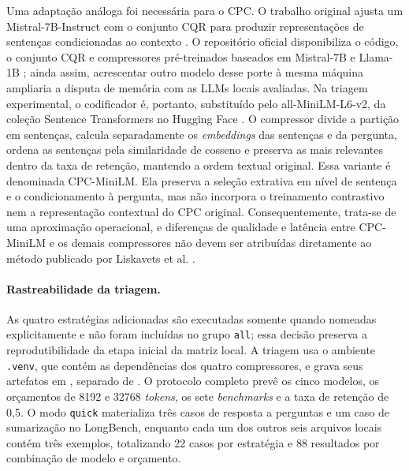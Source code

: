 Uma adaptação análoga foi necessária para o CPC. O trabalho original ajusta um Mistral-7B-Instruct com o conjunto CQR para produzir representações de sentenças condicionadas ao contexto \cite{li2024cpc}. O repositório oficial disponibiliza o código, o conjunto CQR e compressores pré-treinados baseados em Mistral-7B e Llama-1B \cite{workday2025cpc}; ainda assim, acrescentar outro modelo desse porte à mesma máquina ampliaria a disputa de memória com as LLMs locais avaliadas. Na triagem experimental, o codificador é, portanto, substituído pelo all-MiniLM-L6-v2, da coleção Sentence Transformers no Hugging Face \cite{huggingface2022allminilm}. O compressor divide a partição em sentenças, calcula separadamente os \textit{embeddings} das sentenças e da pergunta, ordena as sentenças pela similaridade de cosseno e preserva as mais relevantes dentro da taxa de retenção, mantendo a ordem textual original. Essa variante é denominada CPC-MiniLM. Ela preserva a seleção extrativa em nível de sentença e o condicionamento à pergunta, mas não incorpora o treinamento contrastivo nem a representação contextual do CPC original. Consequentemente, trata-se de uma aproximação operacional, e diferenças de qualidade e latência entre CPC-MiniLM e os demais compressores não devem ser atribuídas diretamente ao método publicado por Liskavets et al. \cite{li2024cpc}.

\paragraph{Rastreabilidade da triagem.}
As quatro estratégias adicionadas são executadas somente quando nomeadas explicitamente e não foram incluídas no grupo \texttt{all}; essa decisão preserva a reprodutibilidade da etapa inicial da matriz local. A triagem usa o ambiente \texttt{.venv}, que contém as dependências dos quatro compressores, e grava seus artefatos em , separado de . O protocolo completo prevê os cinco modelos, os orçamentos de 8192 e 32768 \textit{tokens}, os sete \textit{benchmarks} e a taxa de retenção de 0,5. O modo \texttt{quick} materializa três casos de resposta a perguntas e um caso de sumarização no LongBench, enquanto cada um dos outros seis arquivos locais contém três exemplos, totalizando 22 casos por estratégia e 88 resultados por combinação de modelo e orçamento.

